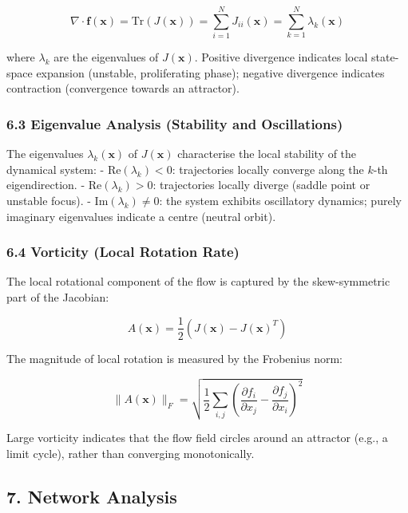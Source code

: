 \documentclass[11pt]{article}
\begin{document}
\begin{equation}
\nabla \cdot \mathbf{f}(\mathbf{x}) = \mathrm{Tr}(J(\mathbf{x})) = \sum_{i=1}^N J_{ii}(\mathbf{x}) = \sum_{k=1}^N \lambda_k(\mathbf{x}) 
\end{equation}


where $\lambda_k$ are the eigenvalues of $J(\mathbf{x})$. Positive divergence indicates local state-space expansion (unstable, proliferating phase); negative divergence indicates contraction (convergence towards an attractor).


\subsubsection*{6.3 Eigenvalue Analysis (Stability and Oscillations)}

The eigenvalues $\lambda_k(\mathbf{x})$ of $J(\mathbf{x})$ characterise the local stability of the dynamical system:
- $\text{Re}(\lambda_k) < 0$: trajectories locally converge along the $k$-th eigendirection.
- $\text{Re}(\lambda_k) > 0$: trajectories locally diverge (saddle point or unstable focus).
- $\text{Im}(\lambda_k) \neq 0$: the system exhibits oscillatory dynamics; purely imaginary eigenvalues indicate a centre (neutral orbit).


\subsubsection*{6.4 Vorticity (Local Rotation Rate)}

The local rotational component of the flow is captured by the skew-symmetric part of the Jacobian:


\begin{equation}
A(\mathbf{x}) = \frac{1}{2}\left(J(\mathbf{x}) - J(\mathbf{x})^T\right) 
\end{equation}


The magnitude of local rotation is measured by the Frobenius norm:


\begin{equation}
\|A(\mathbf{x})\|_F = \sqrt{\frac{1}{2}\sum_{i,j}\left(\frac{\partial f_i}{\partial x_j} - \frac{\partial f_j}{\partial x_i}\right)^2} 
\end{equation}


Large vorticity indicates that the flow field circles around an attractor (e.g., a limit cycle), rather than converging monotonically.



\subsection*{7. Network Analysis}
\end{document}
